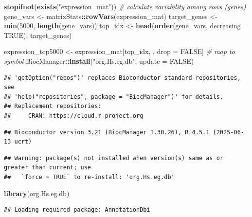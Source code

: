 \documentclass[
]{article}
\newenvironment{Shaded}{\begin{snugshade}}{\end{snugshade}}
\newcommand{\AttributeTok}[1]{\textcolor[rgb]{0.13,0.29,0.53}{#1}}
\newcommand{\CommentTok}[1]{\textcolor[rgb]{0.56,0.35,0.01}{\textit{#1}}}
\newcommand{\ConstantTok}[1]{\textcolor[rgb]{0.56,0.35,0.01}{#1}}
\newcommand{\DecValTok}[1]{\textcolor[rgb]{0.00,0.00,0.81}{#1}}
\newcommand{\FunctionTok}[1]{\textcolor[rgb]{0.13,0.29,0.53}{\textbf{#1}}}
\newcommand{\NormalTok}[1]{#1}
\newcommand{\OtherTok}[1]{\textcolor[rgb]{0.56,0.35,0.01}{#1}}
\newcommand{\SpecialCharTok}[1]{\textcolor[rgb]{0.81,0.36,0.00}{\textbf{#1}}}
\newcommand{\StringTok}[1]{\textcolor[rgb]{0.31,0.60,0.02}{#1}}
\begin{document}
\begin{Shaded}
\begin{Highlighting}[]
\FunctionTok{stopifnot}\NormalTok{(}\FunctionTok{exists}\NormalTok{(}\StringTok{"expression\_mat"}\NormalTok{))}
\CommentTok{\# calculate variability among rows (genes)}
\NormalTok{gene\_vars }\OtherTok{\textless{}{-}}\NormalTok{ matrixStats}\SpecialCharTok{::}\FunctionTok{rowVars}\NormalTok{(expression\_mat)}
\NormalTok{target\_genes }\OtherTok{\textless{}{-}} \FunctionTok{min}\NormalTok{(}\DecValTok{5000}\NormalTok{, }\FunctionTok{length}\NormalTok{(gene\_vars))}
\NormalTok{top\_idx }\OtherTok{\textless{}{-}} \FunctionTok{head}\NormalTok{(}\FunctionTok{order}\NormalTok{(gene\_vars, }\AttributeTok{decreasing =} \ConstantTok{TRUE}\NormalTok{), target\_genes)}

\NormalTok{expression\_top5000 }\OtherTok{\textless{}{-}}\NormalTok{ expression\_mat[top\_idx, , drop }\OtherTok{=} \ConstantTok{FALSE}\NormalTok{]}
\CommentTok{\# map to symbol}
\NormalTok{BiocManager}\SpecialCharTok{::}\FunctionTok{install}\NormalTok{(}\StringTok{"org.Hs.eg.db"}\NormalTok{, }\AttributeTok{update =} \ConstantTok{FALSE}\NormalTok{)}
\end{Highlighting}
\end{Shaded}

\begin{verbatim}
## 'getOption("repos")' replaces Bioconductor standard repositories, see
## 'help("repositories", package = "BiocManager")' for details.
## Replacement repositories:
##     CRAN: https://cloud.r-project.org
\end{verbatim}

\begin{verbatim}
## Bioconductor version 3.21 (BiocManager 1.30.26), R 4.5.1 (2025-06-13 ucrt)
\end{verbatim}

\begin{verbatim}
## Warning: package(s) not installed when version(s) same as or greater than current; use
##   `force = TRUE` to re-install: 'org.Hs.eg.db'
\end{verbatim}

\begin{Shaded}
\begin{Highlighting}[]
\FunctionTok{library}\NormalTok{(org.Hs.eg.db)}
\end{Highlighting}
\end{Shaded}

\begin{verbatim}
## Loading required package: AnnotationDbi
\end{verbatim}
\end{document}
